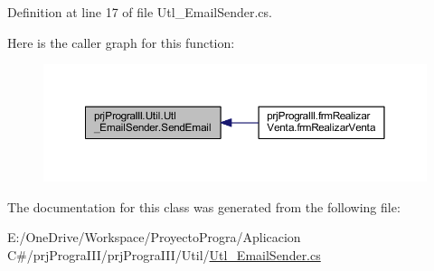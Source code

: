 Definition at line 17 of file Utl\+\_\+\+Email\+Sender.\+cs.

Here is the caller graph for this function\+:
\nopagebreak
\begin{figure}[H]
\begin{center}
\leavevmode
\includegraphics[width=350pt]{classprj_progra_i_i_i_1_1_util_1_1_utl___email_sender_ab95747aa262d37b41440536d14f40d29_icgraph}
\end{center}
\end{figure}


The documentation for this class was generated from the following file\+:\begin{DoxyCompactItemize}
\item 
E\+:/\+One\+Drive/\+Workspace/\+Proyecto\+Progra/\+Aplicacion C\#/prj\+Progra\+I\+I\+I/prj\+Progra\+I\+I\+I/\+Util/\hyperlink{_utl___email_sender_8cs}{Utl\+\_\+\+Email\+Sender.\+cs}\end{DoxyCompactItemize}
